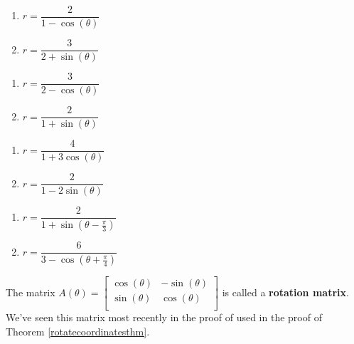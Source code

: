 \begin{multicols}{2}

\begin{enumerate}
\setcounter{enumi}{\value{HW}}
\item  $r = \dfrac{2}{1-\cos(\theta)}$

\item  $r = \dfrac{3}{2 + \sin(\theta)}$
\setcounter{HW}{\value{enumi}}
\end{enumerate}
\end{multicols}

\begin{multicols}{2}

\begin{enumerate}
\setcounter{enumi}{\value{HW}}
\item  $r = \dfrac{3}{2-\cos(\theta)}$

\item  $r = \dfrac{2}{1 + \sin(\theta)}$
\setcounter{HW}{\value{enumi}}
\end{enumerate}
\end{multicols}

\begin{multicols}{2}

\begin{enumerate}
\setcounter{enumi}{\value{HW}}

\item   $r = \dfrac{4}{1+3\cos(\theta)}$

\item  $r = \dfrac{2}{1-2\sin(\theta)}$

\setcounter{HW}{\value{enumi}}
\end{enumerate}
\end{multicols}

\begin{multicols}{2}

\begin{enumerate}
\setcounter{enumi}{\value{HW}}
\item  $r = \dfrac{2}{1 + \sin(\theta - \frac{\pi}{3})}$

\item  $r = \dfrac{6}{3 - \cos\left(\theta + \frac{\pi}{4}\right)}$
\setcounter{HW}{\value{enumi}}
\end{enumerate}
\end{multicols}


 The matrix $A(\theta) = \left[ \begin{array}{rr} \cos(\theta) & -\sin(\theta) \\ \sin(\theta) & \cos(\theta) \\ \end{array} \right]$  is called a \textbf{rotation matrix}. We've seen this matrix most recently in the proof of used in the proof of Theorem \ref{rotatecoordinatesthm}.

